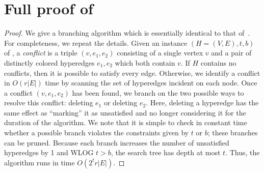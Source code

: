 \section{Full proof of~\texorpdfstring{}{}}
\label{app:pc}



\pceccFPT*
\begin{proof}
    We give a branching algorithm which is essentially identical to that of~.
    For completeness, we repeat the details.
    Given an instance $(H = (V, E), t, b)$ of \pcECC{}, a \emph{conflict} is a triple $(v, e_1, e_2)$ consisting of a single vertex $v$ and a pair of distinctly colored hyperedges $e_1, e_2$ which both contain $v$.
    If $H$ contains no conflicts, then it is possible to satisfy every edge.
    Otherwise, we identify a conflict in $O(r|E|)$ time by scanning the set of hyperedges incident on each node.
    Once a conflict $(v, e_1, e_2)$ has been found, we branch on the two possible ways to resolve this conflict: deleting $e_1$ or deleting $e_2$.
    Here, deleting a hyperedge has the same effect as ``marking'' it as unsatisfied and no longer considering it for the duration of the algorithm.
    We note that it is simple to check in constant time whether a possible branch violates the constraints given by $t$ or $b$; these branches can be pruned.
    Because each branch increases the number of unsatisfied hyperedges by 1 and WLOG $t > b$, the search tree has depth at most $t$.
    Thus, the algorithm runs in time $O(2^{t}r|E|)$.
\end{proof}

